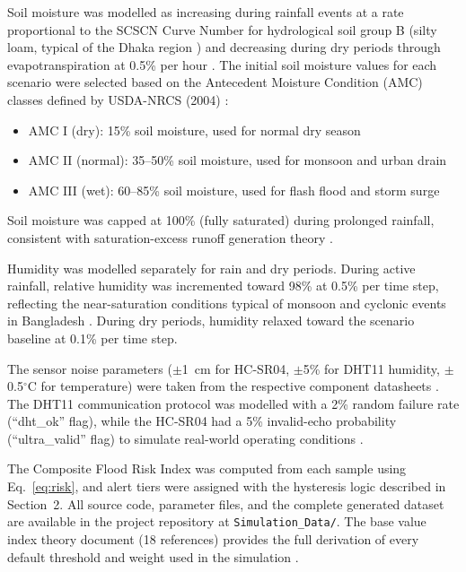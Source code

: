 \documentclass[5p,twocolumn]{elsarticle}
\begin{document}
Soil moisture was modelled as increasing during rainfall events at a rate proportional to the SCSCN Curve Number for hydrological soil group B (silty loam, typical of the Dhaka region \cite{usda2004}) and decreasing during dry periods through evapotranspiration at 0.5\% per hour \cite{tao2024}. The initial soil moisture values for each scenario were selected based on the Antecedent Moisture Condition (AMC) classes defined by USDA-NRCS (2004) \cite{usda2004}:

\begin{itemize}[nosep]
  \item AMC I (dry): 15\% soil moisture, used for normal dry season \cite{bwdb2022}
  \item AMC II (normal): 35--50\% soil moisture, used for monsoon and urban drain \cite{usda2004}
  \item AMC III (wet): 60--85\% soil moisture, used for flash flood and storm surge \cite{tangdamrongsub2021}
\end{itemize}

Soil moisture was capped at 100\% (fully saturated) during prolonged rainfall, consistent with saturation-excess runoff generation theory \cite{hassini2020}.

Humidity was modelled separately for rain and dry periods. During active rainfall, relative humidity was incremented toward 98\% at 0.5\% per time step, reflecting the near-saturation conditions typical of monsoon and cyclonic events in Bangladesh \cite{tao2024}. During dry periods, humidity relaxed toward the scenario baseline at 0.1\% per time step.

The sensor noise parameters ($\pm$1~cm for HC-SR04, $\pm$5\% for DHT11 humidity, $\pm$0.5$^\circ$C for temperature) were taken from the respective component datasheets \cite{hcsr04,dht11}. The DHT11 communication protocol was modelled with a 2\% random failure rate (``dht\_ok'' flag), while the HC-SR04 had a 5\% invalid-echo probability (``ultra\_valid'' flag) to simulate real-world operating conditions \cite{sulistyowati2017}.

The Composite Flood Risk Index was computed from each sample using Eq.~\eqref{eq:risk}, and alert tiers were assigned with the hysteresis logic described in Section~2. All source code, parameter files, and the complete generated dataset are available in the project repository at \texttt{Simulation\_Data/}. The base value index theory document (18 references) provides the full derivation of every default threshold and weight used in the simulation \cite{usda2004,tangdamrongsub2021,kim2014,guo2026,hassini2020,tao2024,rohan2025,zeng2025}.
\end{document}
